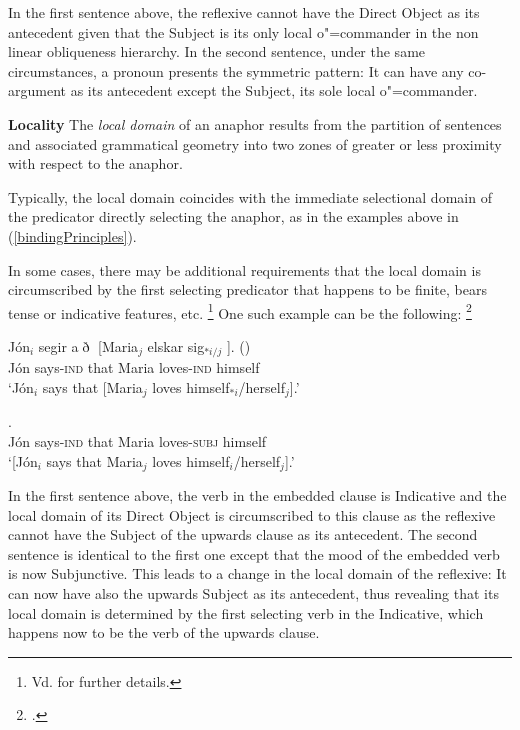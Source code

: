 \documentclass[output=paper
,modfonts
,nonflat]{langsci/langscibook}
\begin{document}
In the first sentence above, the reflexive cannot have the
Direct Object as its antecedent given that the Subject is its only
local  o"=commander in the non linear obliqueness hierarchy.
In the second sentence, under the same circumstances, a pronoun
presents the symmetric pattern: It can have any co-argument as
its antecedent except the Subject, its sole local o"=commander.

\textbf{Locality} The \emph{local domain} of an anaphor results from
the partition of sentences and associated grammatical geometry into two
zones of greater or less proximity with respect to the anaphor.

Typically, the local domain coincides with the immediate selectional domain
of the predicator directly selecting the anaphor, as in the 
examples above in (\ref{bindingPrinciples}). 

In some cases, there may be additional requirements that the local domain
is circumscribed by the first selecting predicator that happens to be finite, 
bears tense or indicative features, etc.%
%
\footnote{
Vd. \citep{manziniWexler:parameters87, kosterReuland:longdistance91, dal:bind93} for further details.
}
One such example can be the following:%
%
\footnote{
\citep[p.47]{manziniWexler:parameters87}.}


\begin{exe}
\ex
\begin{xlist}
\ex
\gll J\'{o}n$_{i}$ segir a$\eth$ [Maria$_{j}$ elskar sig$_{*i/j}$ ]. ()\\
J\'{o}n says-\textsc{ind} that Maria loves-\textsc{ind} himself\\
\trans `J\'{o}n$_{i}$ says that [Maria$_{j}$ loves himself$_{*i}$/herself$_{j}$].'

\ex
{}.\\
J\'{o}n says-\textsc{ind} that Maria loves-\textsc{subj} himself\\
\trans `[J\'{o}n$_{i}$ says that Maria$_{j}$ loves himself$_{i}$/herself$_{j}$].'
\end{xlist}
\end{exe}


In the first sentence above, the verb in the embedded clause is
Indicative and the local domain of its Direct Object is circumscribed
to this clause as the reflexive cannot have the Subject of the upwards
clause as its antecedent. The second sentence is identical to the first
one except that the mood of the embedded verb is now Subjunctive. This leads
to a change in the local domain of the reflexive: It can now have also the upwards
Subject as its antecedent, thus revealing that its local domain is determined
by the first selecting verb in the Indicative, which happens now to be the
verb of the upwards clause.
\end{document}
